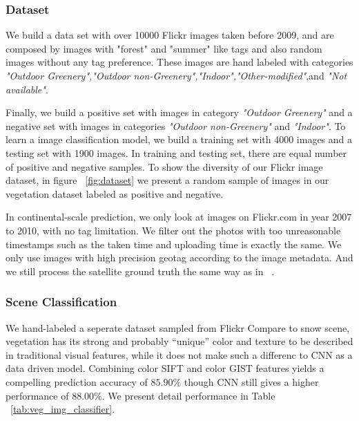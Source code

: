 \subsubsection{Dataset}
We build a data set with over 10000 Flickr images taken before 2009, and are composed by images with "forest" and "summer" like tags 
and also random images without any tag preference. These images are hand labeled with categories 
\textit{"Outdoor Greenery","Outdoor non-Greenery","Indoor","Other-modified"},and \textit{"Not available"}.

Finally, we build a positive set with images in category \textit{"Outdoor Greenery"} and a negative set 
with images in categories \textit{"Outdoor non-Greenery"} and \textit{"Indoor"}. To learn a image classification model, 
we build a training set with 4000 images and a testing set with 1900 images. 
In training and testing set, there are equal number of positive and negative samples.
To show the diversity of our Flickr image dataset, in figure ~\ref{fig:dataset}
we present a random sample of images in our vegetation dataset labeled as positive and negative.

In continental-scale prediction, we only look at images on Flickr.com in year 2007 to 2010, with no tag limitation. 
We filter out the photos with too unreasonable timestamps such as the taken time and uploading time is exactly the same.
We only use images with high precision geotag according to the image metadata. And we still process the 
satellite ground truth the same way as in ~\cite{ecology2012www}.



\subsubsection{Scene Classification}
We hand-labeled a seperate dataset sampled from Flickr 
Compare to snow scene, vegetation has its strong and probably ``unique'' color and texture to be described in traditional visual 
features, while it does not make such a differenc to CNN as a data driven model. Combining color SIFT and color GIST features yields a 
compelling prediction accuracy of $85.90\%$ though CNN still gives a higher performance of $88.00\%$. We present detail performance in Table 
~\ref{tab:veg_img_classifier}.

